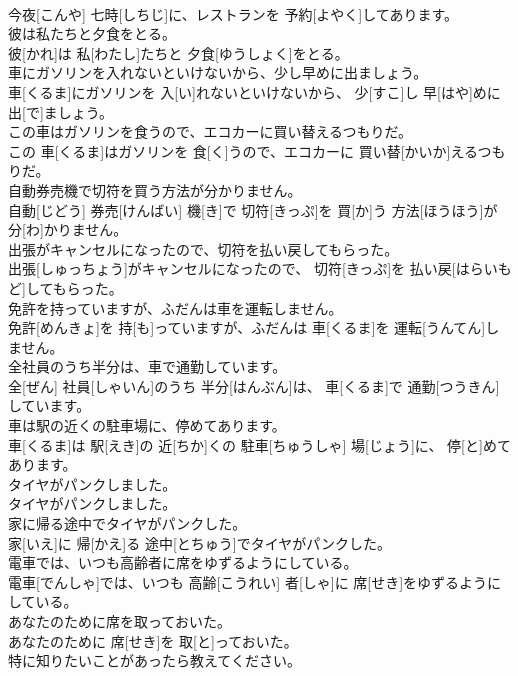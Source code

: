 \documentclass[8pt]{extreport}
\begin{document}
\begin{CJK}{UTF8}{min}
\\	今夜[こんや] 七時[しちじ]に、レストランを 予約[よやく]してあります。	
\\	彼は私たちと夕食をとる。	
\\	彼[かれ]は 私[わたし]たちと 夕食[ゆうしょく]をとる。	
\\	車にガソリンを入れないといけないから、少し早めに出ましょう。	
\\	車[くるま]にガソリンを 入[い]れないといけないから、 少[すこ]し 早[はや]めに 出[で]ましょう。	
\\	この車はガソリンを食うので、エコカーに買い替えるつもりだ。	
\\	この 車[くるま]はガソリンを 食[く]うので、エコカーに 買い替[かいか]えるつもりだ。	
\\	自動券売機で切符を買う方法が分かりません。	
\\	自動[じどう] 券売[けんばい] 機[き]で 切符[きっぷ]を 買[か]う 方法[ほうほう]が 分[わ]かりません。	
\\	出張がキャンセルになったので、切符を払い戻してもらった。	
\\	出張[しゅっちょう]がキャンセルになったので、 切符[きっぷ]を 払い戻[はらいもど]してもらった。	
\\	免許を持っていますが、ふだんは車を運転しません。	
\\	免許[めんきょ]を 持[も]っていますが、ふだんは 車[くるま]を 運転[うんてん]しません。	
\\	全社員のうち半分は、車で通勤しています。	
\\	全[ぜん] 社員[しゃいん]のうち 半分[はんぶん]は、 車[くるま]で 通勤[つうきん]しています。	
\\	車は駅の近くの駐車場に、停めてあります。	
\\	車[くるま]は 駅[えき]の 近[ちか]くの 駐車[ちゅうしゃ] 場[じょう]に、 停[と]めてあります。	
\\	タイヤがパンクしました。	
\\	タイヤがパンクしました。	
\\	家に帰る途中でタイヤがパンクした。	
\\	家[いえ]に 帰[かえ]る 途中[とちゅう]でタイヤがパンクした。	
\\	電車では、いつも高齢者に席をゆずるようにしている。	
\\	電車[でんしゃ]では、いつも 高齢[こうれい] 者[しゃ]に 席[せき]をゆずるようにしている。	
\\	あなたのために席を取っておいた。	
\\	あなたのために 席[せき]を 取[と]っておいた。	
\\	特に知りたいことがあったら教えてください。	

\end{CJK}
\end{document}
